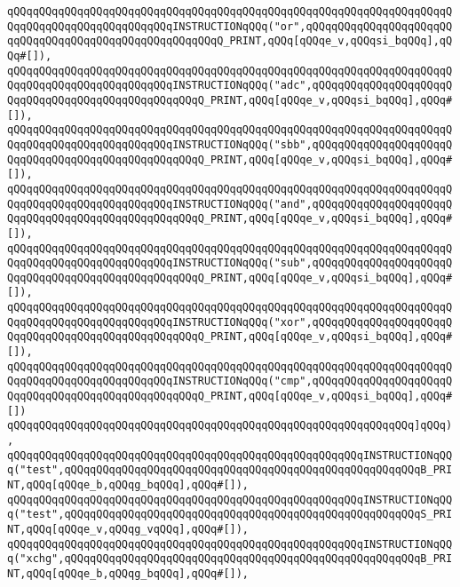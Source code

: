 \verb|qQQqqQQqqQQqqQQqqQQqqQQqqQQqqQQqqQQqqQQqqQQqqQQqqQQqqQQqqQQqqQQqqQQqqQQqqQQqqQQqqQQqqQQqqQQqqQQqINSTRUCTIONqQQq("or",qQQqqQQqqQQqqQQqqQQqqQQqqQQqqQQqqQQqqQQqqQQqqQQqqQQqqQQqQ_PRINT,qQQq[qQQqe_v,qQQqsi_bqQQq],qQQq#[]),|\newline
\verb|qQQqqQQqqQQqqQQqqQQqqQQqqQQqqQQqqQQqqQQqqQQqqQQqqQQqqQQqqQQqqQQqqQQqqQQqqQQqqQQqqQQqqQQqqQQqqQQqINSTRUCTIONqQQq("adc",qQQqqQQqqQQqqQQqqQQqqQQqqQQqqQQqqQQqqQQqqQQqqQQqqQQqQ_PRINT,qQQq[qQQqe_v,qQQqsi_bqQQq],qQQq#[]),|\newline
\verb|qQQqqQQqqQQqqQQqqQQqqQQqqQQqqQQqqQQqqQQqqQQqqQQqqQQqqQQqqQQqqQQqqQQqqQQqqQQqqQQqqQQqqQQqqQQqqQQqINSTRUCTIONqQQq("sbb",qQQqqQQqqQQqqQQqqQQqqQQqqQQqqQQqqQQqqQQqqQQqqQQqqQQqQ_PRINT,qQQq[qQQqe_v,qQQqsi_bqQQq],qQQq#[]),|\newline
\verb|qQQqqQQqqQQqqQQqqQQqqQQqqQQqqQQqqQQqqQQqqQQqqQQqqQQqqQQqqQQqqQQqqQQqqQQqqQQqqQQqqQQqqQQqqQQqqQQqINSTRUCTIONqQQq("and",qQQqqQQqqQQqqQQqqQQqqQQqqQQqqQQqqQQqqQQqqQQqqQQqqQQqQ_PRINT,qQQq[qQQqe_v,qQQqsi_bqQQq],qQQq#[]),|\newline
\verb|qQQqqQQqqQQqqQQqqQQqqQQqqQQqqQQqqQQqqQQqqQQqqQQqqQQqqQQqqQQqqQQqqQQqqQQqqQQqqQQqqQQqqQQqqQQqqQQqINSTRUCTIONqQQq("sub",qQQqqQQqqQQqqQQqqQQqqQQqqQQqqQQqqQQqqQQqqQQqqQQqqQQqQ_PRINT,qQQq[qQQqe_v,qQQqsi_bqQQq],qQQq#[]),|\newline
\verb|qQQqqQQqqQQqqQQqqQQqqQQqqQQqqQQqqQQqqQQqqQQqqQQqqQQqqQQqqQQqqQQqqQQqqQQqqQQqqQQqqQQqqQQqqQQqqQQqINSTRUCTIONqQQq("xor",qQQqqQQqqQQqqQQqqQQqqQQqqQQqqQQqqQQqqQQqqQQqqQQqqQQqQ_PRINT,qQQq[qQQqe_v,qQQqsi_bqQQq],qQQq#[]),|\newline
\verb|qQQqqQQqqQQqqQQqqQQqqQQqqQQqqQQqqQQqqQQqqQQqqQQqqQQqqQQqqQQqqQQqqQQqqQQqqQQqqQQqqQQqqQQqqQQqqQQqINSTRUCTIONqQQq("cmp",qQQqqQQqqQQqqQQqqQQqqQQqqQQqqQQqqQQqqQQqqQQqqQQqqQQqQ_PRINT,qQQq[qQQqe_v,qQQqsi_bqQQq],qQQq#[])|\newline
\verb|qQQqqQQqqQQqqQQqqQQqqQQqqQQqqQQqqQQqqQQqqQQqqQQqqQQqqQQqqQQqqQQq]qQQq),|\newline
\verb|qQQqqQQqqQQqqQQqqQQqqQQqqQQqqQQqqQQqqQQqqQQqqQQqqQQqqQQqINSTRUCTIONqQQq("test",qQQqqQQqqQQqqQQqqQQqqQQqqQQqqQQqqQQqqQQqqQQqqQQqqQQqqQQqB_PRINT,qQQq[qQQqe_b,qQQqg_bqQQq],qQQq#[]),|\newline
\verb|qQQqqQQqqQQqqQQqqQQqqQQqqQQqqQQqqQQqqQQqqQQqqQQqqQQqqQQqINSTRUCTIONqQQq("test",qQQqqQQqqQQqqQQqqQQqqQQqqQQqqQQqqQQqqQQqqQQqqQQqqQQqqQQqS_PRINT,qQQq[qQQqe_v,qQQqg_vqQQq],qQQq#[]),|\newline
\verb|qQQqqQQqqQQqqQQqqQQqqQQqqQQqqQQqqQQqqQQqqQQqqQQqqQQqqQQqINSTRUCTIONqQQq("xchg",qQQqqQQqqQQqqQQqqQQqqQQqqQQqqQQqqQQqqQQqqQQqqQQqqQQqqQQqB_PRINT,qQQq[qQQqe_b,qQQqg_bqQQq],qQQq#[]),|\newline
